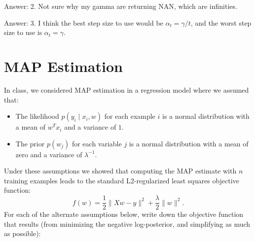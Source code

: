\documentclass{article}
\def\ans#1{\par\gre{Answer: #1}}
\def\blu#1{{\color{blu}#1}}
\def\gre#1{{\color{gre}#1}}
\def\norm#1{\|#1\|}
\def\cond{\; | \;}
\def\items#1{\begin{itemize}#1\end{itemize}}
\begin{document}
\ans{2. Not sure why my gamma are returning NAN, which are infinities.}

\ans{3. I think the best step size to use would be $\alpha_t = \gamma/t$, and the worst step size to use is $\alpha_t = \gamma$.}

\pagebreak

\section{MAP Estimation}

In class, we considered MAP estimation in a regression model where we assumed that:
\items{
\item The likelihood $p(y_i \cond x_i, w)$ for each example $i$ is a normal distribution with a mean of $w^Tx_i$ and a variance of $1$.
\item The prior $p(w_j)$ for each variable $j$ is a normal distribution with a mean of zero and a variance of $\lambda^{-1}$.
}
Under these assumptions we showed that computing the MAP estimate with $n$ training examples leads to the standard L2-regularized least squares objective function:
\[
f(w) = \frac{1}{2}\norm{Xw - y}^2 + \frac \lambda 2 \norm{w}^2.
\]
\blu{For each of the alternate assumptions below, write down the objective function that results} (from minimizing the negative log-posterior, and simplifying as much as possible):
\end{document}
